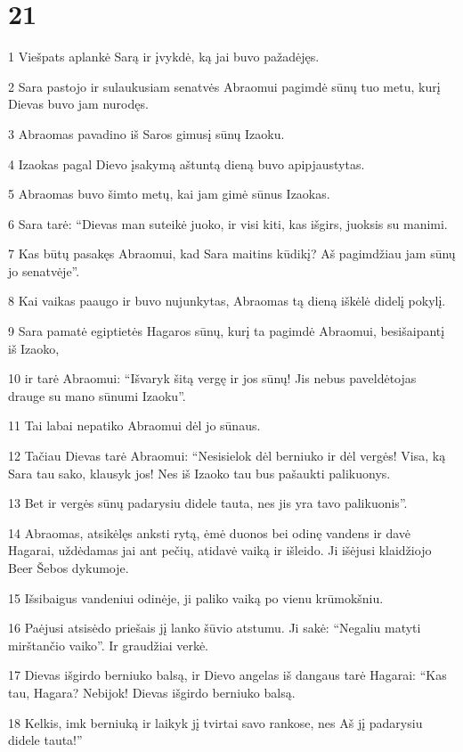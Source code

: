 \chapter{21}

\par 1 Viešpats aplankė Sarą ir įvykdė, ką jai buvo pažadėjęs. 
\par 2 Sara pastojo ir sulaukusiam senatvės Abraomui pagimdė sūnų tuo metu, kurį Dievas buvo jam nurodęs. 
\par 3 Abraomas pavadino iš Saros gimusį sūnų Izaoku. 
\par 4 Izaokas pagal Dievo įsakymą aštuntą dieną buvo apipjaustytas. 
\par 5 Abraomas buvo šimto metų, kai jam gimė sūnus Izaokas. 
\par 6 Sara tarė: “Dievas man suteikė juoko, ir visi kiti, kas išgirs, juoksis su manimi. 
\par 7 Kas būtų pasakęs Abraomui, kad Sara maitins kūdikį? Aš pagimdžiau jam sūnų jo senatvėje”. 
\par 8 Kai vaikas paaugo ir buvo nujunkytas, Abraomas tą dieną iškėlė didelį pokylį. 
\par 9 Sara pamatė egiptietės Hagaros sūnų, kurį ta pagimdė Abraomui, besišaipantį iš Izaoko, 
\par 10 ir tarė Abraomui: “Išvaryk šitą vergę ir jos sūnų! Jis nebus paveldėtojas drauge su mano sūnumi Izaoku”. 
\par 11 Tai labai nepatiko Abraomui dėl jo sūnaus. 
\par 12 Tačiau Dievas tarė Abraomui: “Nesisielok dėl berniuko ir dėl vergės! Visa, ką Sara tau sako, klausyk jos! Nes iš Izaoko tau bus pašaukti palikuonys. 
\par 13 Bet ir vergės sūnų padarysiu didele tauta, nes jis yra tavo palikuonis”. 
\par 14 Abraomas, atsikėlęs anksti rytą, ėmė duonos bei odinę vandens ir davė Hagarai, uždėdamas jai ant pečių, atidavė vaiką ir išleido. Ji išėjusi klaidžiojo Beer Šebos dykumoje. 
\par 15 Išsibaigus vandeniui odinėje, ji paliko vaiką po vienu krūmokšniu. 
\par 16 Paėjusi atsisėdo priešais jį lanko šūvio atstumu. Ji sakė: “Negaliu matyti mirštančio vaiko”. Ir graudžiai verkė. 
\par 17 Dievas išgirdo berniuko balsą, ir Dievo angelas iš dangaus tarė Hagarai: “Kas tau, Hagara? Nebijok! Dievas išgirdo berniuko balsą. 
\par 18 Kelkis, imk berniuką ir laikyk jį tvirtai savo rankose, nes Aš jį padarysiu didele tauta!” 
